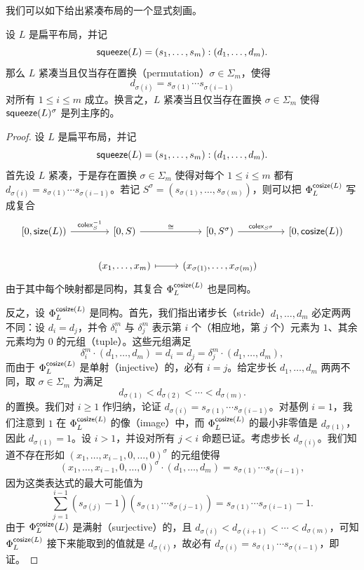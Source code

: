 我们可以如下给出紧凑布局的一个显式刻画。

\begin{proposition}\label{compactisomorphismproposition}
    设 $L$ 是扁平布局，并记
    \[
    \mathsf{squeeze}(L) = (s_1,\dots,s_m):(d_1,\dots,d_m).
    \]
    那么 $L$ 紧凑当且仅当存在置换（permutation）$\sigma \in \Sigma_m$，使得
    \[
    d_{\sigma(i)} = s_{\sigma(1)}\cdots s_{\sigma(i-1)}
    \]
    对所有 $1 \leq i \leq m$ 成立。换言之，$L$ 紧凑当且仅当存在置换 $\sigma \in \Sigma_m$ 使得 $\mathsf{squeeze}(L)^\sigma$ 是列主序的。
\end{proposition}


\begin{proof}
    设 $L$ 是扁平布局，并记
    \[
    \mathsf{squeeze}(L) = (s_1,\dots,s_m):(d_1,\dots,d_m).
    \]
    首先设 $L$ 紧凑，于是存在置换 $\sigma \in \Sigma_m$ 使得对每个 $1 \leq i \leq m$ 都有 $d_{\sigma(i)} = s_{\sigma(1)} \cdots s_{\sigma(i-1)}$。若记 $S^\sigma = (s_{\sigma(1)},\dots,s_{\sigma(m)})$，则可以把 $\Phi_L^{\mathsf{cosize}(L)}$ 写成复合
    \[ \begin{tikzcd} [column sep = 12]
    {[}0,\size(L){)} \ar[rr,"\colex_S^{-1}"] & & {[}0,S{)} \ar[rr,"\cong"] & & {[}0,S^\sigma{)}\ar[rr,"\colex_{S^\sigma}"] & & {[}0,\cosize(L){)}\\
    & & (x_1,\dots,x_m) \ar[rr,mapsto] & & (x_{\sigma(1)},\dots,x_{\sigma(m)})
    \end{tikzcd} \]
    由于其中每个映射都是同构，其复合 $\Phi_L^{\mathsf{cosize}(L)}$ 也是同构。

    反之，设 $\Phi_L^{\mathsf{cosize}(L)}$ 是同构。首先，我们指出诸步长（stride）$d_1,\dots,d_m$ 必定两两不同：设 $d_i = d_j$，并令 $\delta_i^m$ 与 $\delta_j^m$ 表示第 $i$ 个（相应地，第 $j$ 个）元素为 $1$、其余元素均为 $0$ 的元组（tuple）。这些元组满足
    \[
    \delta_i^m \cdot (d_1,\dots,d_m) = d_i = d_j = \delta_j^m \cdot (d_1,\dots,d_m),
    \]
    而由于 $\Phi_L^{\mathsf{cosize}(L)}$ 是单射（injective）的，必有 $i=j$。给定步长 $d_1,\dots,d_m$ 两两不同，取 $\sigma \in \Sigma_m$ 为满足
    \[d_{\sigma(1)} < d_{\sigma(2)} < \cdots < d_{\sigma(m)}.\]
    的置换。我们对 $i \geq 1$ 作归纳，论证 $d_{\sigma(i)} = s_{\sigma(1)} \cdots s_{\sigma(i-1)}$。对基例 $i=1$，我们注意到 $1$ 在 $\Phi_L^{\mathsf{cosize}(L)}$ 的像（image）中，而 $\Phi_L^{\mathsf{cosize}(L)}$ 的最小非零值是 $d_{\sigma(1)}$，因此 $d_{\sigma(1)} = 1$。设 $i>1$，并设对所有 $j < i$ 命题已证。考虑步长 $d_{\sigma(i)}$。我们知道不存在形如 $(x_1,\dots,x_{i-1},0,\dots,0)^\sigma$ 的元组使得
    \[(x_1,\dots,x_{i-1},0,\dots,0)^\sigma \cdot (d_1,\dots,d_m) = s_{\sigma(1)}\cdots s_{\sigma(i-1)},\] 因为这类表达式的最大可能值为
    \[
    \sum_{j = 1}^{i-1} (s_{\sigma(j)}-1)(s_{\sigma(1)}\cdots s_{\sigma(j-1)}) = s_{\sigma(1)} \cdots s_{\sigma(i-1)} - 1.
    \]
    由于 $\Phi_L^{\mathsf{cosize}}(L)$ 是满射（surjective）的，且 $d_{\sigma(i)} <  d_{\sigma(i+1)} <  \cdots <  d_{\sigma(m)}$，可知 $\Phi_L^{\mathsf{cosize}(L)}$ 接下来能取到的值就是 $d_{\sigma(i)}$，故必有 $d_{\sigma(i)} = s_{\sigma(1)}\cdots s_{\sigma(i-1)}$，即证。
\end{proof}

